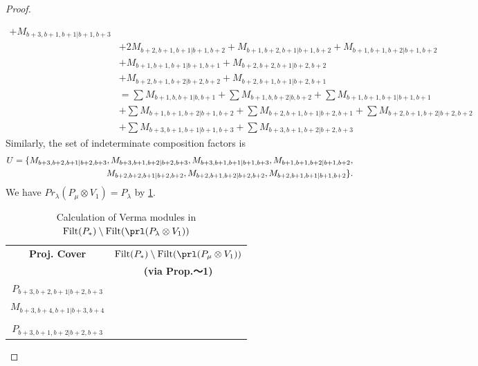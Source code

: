 \begin{proof}
\begin{enumerate}
\begin{enumerate}
\begin{equation}
\begin{aligned}
+ M_{b+3,b+1,b+1|b+1,b+3}\\
                                            &
+ 2M_{b+2,b+1,b+1|b+1,b+2}
+ M_{b+1,b+2,b+1|b+1,b+2}
+ M_{b+1,b+1,b+2|b+1,b+2}\\
                                            &
+ M_{b+1,b+1,b+1|b+1,b+1}
+ M_{b+2,b+2,b+1|b+2,b+2}\\
                                            &
+ M_{b+2,b+1,b+2|b+2,b+2}
+ M_{b+2,b+1,b+1|b+2,b+1} \\
                                               &=
\sum M_{b+1,b,b+1|b,b+1}
+ \sum M_{b+1,b,b+2|b,b+2}
+ \sum M_{b+1,b+1,b+1|b+1,b+1}\\
                                            &
+ \sum M_{b+1,b+1,b+2|b+1,b+2}
+ \sum M_{b+2,b+1,b+1|b+2,b+1}
+ \sum M_{b+2,b+1,b+2|b+2,b+2}\\
                                            &
+ \sum M_{b+3,b+1,b+1|b+1,b+3}
+ \sum M_{b+3,b+1,b+2|b+2,b+3}
          \end{aligned}
        \end{equation}
      Similarly, the set of indeterminate composition factors is 
\begin{equation}\notag
  \begin{aligned}
    U = \{
M_{b+3,b+2,b+1|b+2,b+3},
M_{b+3,b+1,b+2|b+2,b+3},
M_{b+3,b+1,b+1|b+1,b+3},
M_{b+1,b+1,b+2|b+1,b+2},\\
M_{b+2,b+2,b+1|b+2,b+2},
M_{b+2,b+1,b+2|b+2,b+2},
M_{b+2,b+1,b+1|b+1,b+2}
\}.
  \end{aligned}
\end{equation}
       We have $Pr_{\lambda}(P_\mu \otimes V_{1}) = P_\lambda  $ by \cref{tab:verma-analysis_17}.
\begin{table}[htbp]
\centering
\caption{Calculation of Verma modules in $\operatorname{Filt}(P_*) \setminus \operatorname{Filt}(\prl(P_\lambda \otimes V_{1})) $ } \label{tab:verma-analysis_17}
\begin{tabular}{cc}
\toprule
\textbf{Proj. Cover} & \textbf{$\operatorname{Filt}(P_*) \setminus \operatorname{Filt}(\prl(P_\mu \otimes V_{1})) $}  \\
     & \textbf{(via Prop.～1)}  \\
\midrule
 $P_{b+3,b+2,b+1|b+2,b+3}$ & \makecell{
 $M_{b+4,b+2,b+1|b+2,b+4}$,
 $M_{b+3,b+3,b+1|b+3,b+3}$,
 $M_{b+4,b+3,b+1|b+4,b+3}$,
 $M_{b+4,b+3,b+1|b+3,b+4}$, \\
 $M_{b+3,b+4,b+1|b+3,b+4}$
}\\
 & \\
 $P_{b+3,b+1,b+2|b+2,b+3}$ & \makecell{
}
\end{tabular}
\end{table}
\end{enumerate}
\end{enumerate}
\end{proof}

